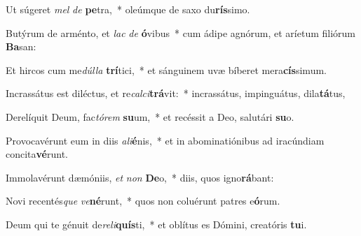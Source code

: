 \item Ut súgeret \textit{mel} \textit{de} \textbf{pe}tra,~* oleúmque de saxo du\textbf{rís}simo.
\item Butýrum de arménto, et \textit{lac} \textit{de} \textbf{ó}vibus~* cum ádipe agnórum, et aríetum filiórum \textbf{Ba}san:
\item Et hircos cum me\textit{dúl}\textit{la} \textbf{trí}tici,~* et sánguinem uvæ bíberet mera\textbf{cís}simum.
\item Incrassátus est diléctus, et re\textit{cal}\textit{ci}\textbf{trá}vit:~* incrassátus, impinguátus, dila\textbf{tá}tus,
\item Derelíquit Deum, fac\textit{tó}\textit{rem} \textbf{su}um,~* et recéssit a Deo, salutári \textbf{su}o.
\item Provocavérunt eum in diis \textit{a}\textit{li}\textbf{é}nis,~* et in abominatiónibus ad iracúndiam concita\textbf{vé}runt.
\item Immolavérunt dæmóniis, \textit{et} \textit{non} \textbf{De}o,~* diis, quos igno\textbf{rá}bant:
\item Novi recentés\textit{que} \textit{ve}\textbf{né}runt,~* quos non coluérunt patres e\textbf{ó}rum.
\item Deum qui te génuit de\textit{re}\textit{li}\textbf{quís}ti,~* et oblítus es Dómini, creatóris \textbf{tu}i.

